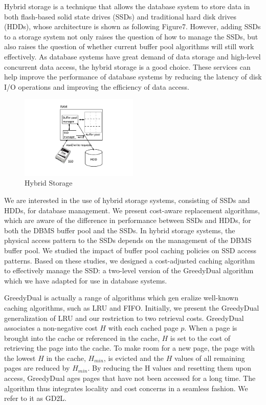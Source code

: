 \documentclass[11pt,a4paper]{article}
\begin{document}
Hybrid storage is a technique that allows the database system to store data in  both flash-based solid state drives (SSDs) and traditional hard disk drives (HDDs), whose architecture is shown as following Figure7.
However, adding SSDs to a storage system not only raises the question of how to manage the SSDs, but also raises the question of whether current buffer pool algorithms will still work effectively.
As database systems have great demand of data storage and high-level concurrent data access, the hybrid storage is a good choice.
These services can help improve the performance of database systems by reducing the latency of disk I/O operations and improving the efficiency of data access.

\begin{figure}[h!]
    \centering
    \includegraphics[width=0.5\textwidth]{hybrid.png}
    \caption{Hybrid Storage}
\end{figure}



We are interested in the use of hybrid storage systems, consisting of SSDs and HDDs, for database management. 
We present cost-aware replacement algorithms, which are aware of the difference in performance between SSDs and HDDs, for both the DBMS buffer pool and the SSDs.
In hybrid storage systems, the physical access pattern to the SSDs depends on the management of the DBMS buffer pool. 
We studied the impact of buffer pool caching policies on SSD access patterns.
Based on these studies, we designed a cost-adjusted caching algorithm to effectively manage the SSD: a two-level version of the GreedyDual algorithm which we have adapted for use in database systems. 

GreedyDual is actually a range of algorithms which gen  eralize well-known caching algorithms, such as LRU and FIFO. 
Initially, we present the GreedyDual generalization of LRU and our restriction to two retrieval costs.
GreedyDual associates a non-negative cost $H$ with each cached page $p$. 
When a page is brought into the cache or referenced in the cache, $H$ is set to the cost of retrieving the page into the cache. 
To make room for a new page, the page with the lowest $H$ in the cache, $H_{min}$, is evicted and the $H$ values of all remaining pages are reduced by $H_{min}$.
By reducing the H values and resetting them upon access, GreedyDual ages pages that have not been accessed for a long time. 
The algorithm thus integrates locality and cost concerns in a seamless fashion.
We refer to it as GD2L. \cite{10.14778/2536354.2536355}
\end{document}
